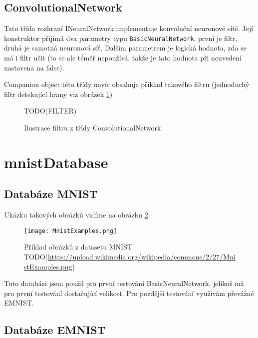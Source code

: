 \documentclass[12pt]{report}			%
\begin{document}
				\subsection{ConvolutionalNetwork}
					Tato třída rozhraní INeuralNetwork implementuje konvoluční neuronové sítě. Její konstruktor přijímá dva parametry typu \verb!BasicNeuralNetwork!, první je filtr, druhá je samotná neuronová síť. Dalším parametrem je logická hodnota, zda se má i filtr učit (to se ale téměř nepoužívá, takže je tato hodnota při neuvedení nastavena na false).
					
					Companion object této třídy navíc obsahuje příklad takového filtru (jednoduchý filtr detekující hrany viz obrázek \ref{fig:filter})
					\begin{figure}
						TODO(FILTER)
						\caption{Ilustrace filtru z třídy ConvolutionalNetwork}
						\label{fig:filter}
					\end{figure}
			
			\section{mnistDatabase}
				\subsection{Databáze MNIST}
					 \parencite[přeloženo]{online:MNIST} Ukázku takových obrázků vidíme na obrázku \ref{fig:MNIST}.
					
					\begin{figure}
						\texttt{[image: MnistExamples.png]}
						\caption{Příklad obrázků z datasetu MNIST\\TODO(\url{https://upload.wikimedia.org/wikipedia/commons/2/27/MnistExamples.png})}
						\label{fig:MNIST}
					\end{figure}
					
					Tuto databázi jsem použil pro první testování BasicNeuralNetwork, jelikož má pro první testování dostačující velikost. Pro pozdější testování využívám převážně EMNIST.
				\subsection{Databáze EMNIST}
					 \parencite[přeloženo]{article:EMNIST}
					
\end{document}
